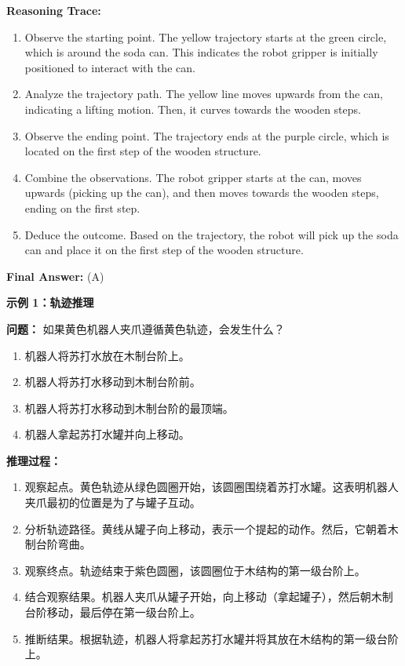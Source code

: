 \documentclass[12pt,a4paper]{article}
\begin{document}
\begin{itemize}
    \textbf{Reasoning Trace:}
    \begin{enumerate}
        \item Observe the starting point. The yellow trajectory starts at the green circle, which is around the soda can. This indicates the robot gripper is initially positioned to interact with the can.
        \item Analyze the trajectory path. The yellow line moves upwards from the can, indicating a lifting motion. Then, it curves towards the wooden steps.
        \item Observe the ending point. The trajectory ends at the purple circle, which is located on the first step of the wooden structure.
        \item Combine the observations. The robot gripper starts at the can, moves upwards (picking up the can), and then moves towards the wooden steps, ending on the first step.
        \item Deduce the outcome. Based on the trajectory, the robot will pick up the soda can and place it on the first step of the wooden structure.
    \end{enumerate}

    \textbf{Final Answer:} (A)

    \textbf{示例 1：轨迹推理}

    \textbf{问题：} 如果黄色机器人夹爪遵循黄色轨迹，会发生什么？
    \begin{enumerate}[label=\Alph*.]
        \item 机器人将苏打水放在木制台阶上。
        \item 机器人将苏打水移动到木制台阶前。
        \item 机器人将苏打水移动到木制台阶的最顶端。
        \item 机器人拿起苏打水罐并向上移动。
    \end{enumerate}

    \textbf{推理过程：}
    \begin{enumerate}
        \item 观察起点。黄色轨迹从绿色圆圈开始，该圆圈围绕着苏打水罐。这表明机器人夹爪最初的位置是为了与罐子互动。
        \item 分析轨迹路径。黄线从罐子向上移动，表示一个提起的动作。然后，它朝着木制台阶弯曲。
        \item 观察终点。轨迹结束于紫色圆圈，该圆圈位于木结构的第一级台阶上。
        \item 结合观察结果。机器人夹爪从罐子开始，向上移动（拿起罐子），然后朝木制台阶移动，最后停在第一级台阶上。
        \item 推断结果。根据轨迹，机器人将拿起苏打水罐并将其放在木结构的第一级台阶上。
    \end{enumerate}


\end{itemize}
\end{document}
